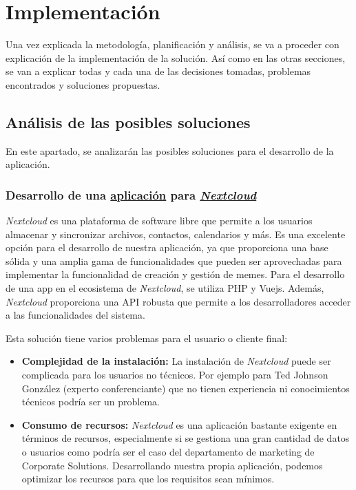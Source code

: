 \chapter{Implementación}

Una vez explicada la metodología, planificación y análisis, se va a proceder con explicación de la implementación de la solución. Así como en las otras secciones, se van a explicar todas y cada una de las decisiones tomadas, problemas encontrados y soluciones propuestas.

\section{Análisis de las posibles soluciones}

En este apartado, se analizarán las posibles soluciones para el desarrollo de la aplicación.

\subsection{Desarrollo de una \href{https://apps.nextcloud.com/}{aplicación} para \href{https://nextcloud.com/es/}{\textit{Nextcloud}}}

\textit{Nextcloud} es una plataforma de software libre que permite a los usuarios almacenar y sincronizar archivos, contactos, calendarios y más. Es una excelente opción para el desarrollo de nuestra aplicación, ya que proporciona una base sólida y una amplia gama de funcionalidades que pueden ser aprovechadas para implementar la funcionalidad de creación y gestión de memes. Para el desarrollo de una app en el ecosistema de \textit{Nextcloud}, se utiliza PHP y Vuejs. Además, \textit{Nextcloud} proporciona una API robusta que permite a los desarrolladores acceder a las funcionalidades del sistema.

Esta solución tiene varios problemas para el usuario o cliente final:

\begin{itemize}
    \item \textbf{Complejidad de la instalación:} La instalación de \textit{Nextcloud} puede ser complicada para los usuarios no técnicos. Por ejemplo para Ted Johnson González (experto conferenciante) que no tienen experiencia ni conocimientos técnicos podría ser un problema.
    \item \textbf{Consumo de recursos:} \textit{Nextcloud} es una aplicación bastante exigente en términos de recursos, especialmente si se gestiona una gran cantidad de datos o usuarios como podría ser el caso del departamento de marketing de Corporate Solutions. Desarrollando nuestra propia aplicación, podemos optimizar los recursos para que los requisitos sean mínimos.
\end{itemize}

